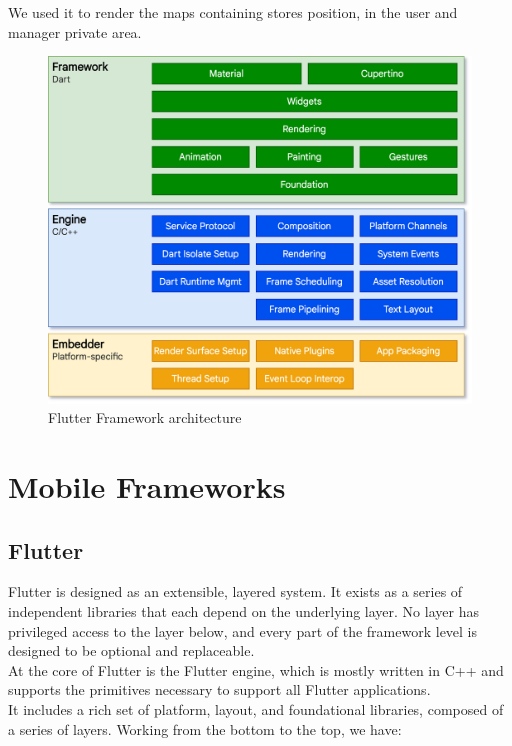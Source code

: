 \documentclass[table, 12pt]{article}
\begin{document}
We used it to render the maps containing stores position, in the user and manager private area.
\newpage
\begin{figure}[H]
    \includegraphics[width=\textwidth]{assets/FlutterArchitecture.png}
    \caption{Flutter Framework architecture}
    \label{spring_architecture}
\end{figure}
\section{Mobile Frameworks}
\subsection{Flutter}
Flutter is designed as an extensible, layered system. It exists as a series of independent libraries that each depend on the underlying layer. No layer has privileged access to the layer below, and every part of the framework level is designed to be optional and replaceable.\\
At the core of Flutter is the Flutter engine, which is mostly written in C++ and supports the primitives necessary to support all Flutter applications.\\
It includes a rich set of platform, layout, and foundational libraries, composed of a series of layers. Working from the bottom to the top, we have:
\end{document}
